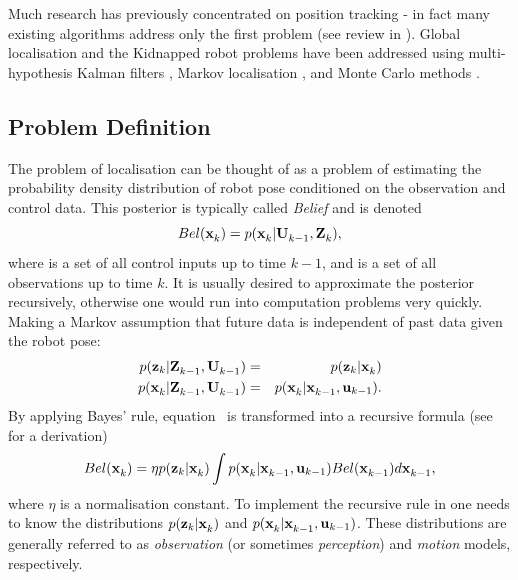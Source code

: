 Much research has previously concentrated on position tracking - in
fact many existing algorithms address only the first problem (see
review in \cite{Borenstein96}). Global localisation and the Kidnapped
robot problems have been addressed using multi-hypothesis Kalman
filters \cite{JensfeltKristensen01,Cox94}, Markov localisation
\cite{Fox99}, and Monte Carlo methods \cite{Thrun00j}.


\subsection{Problem Definition}

The problem of localisation can be thought of as a problem of
estimating the probability density distribution of robot pose
conditioned on the observation and control data.  This posterior is
typically called {\it Belief} and is denoted
\begin{equation}
  Bel(\x{k}{}{}) = p(\x{k}{}{} | \Uall{k-1}{}, \Zall{k}{}),
\label{eqn:localise_belief}
\end{equation}
where  is a set of all control inputs up to time $k-1$, and
 is a set of all observations up to time $k$. It is usually
desired to approximate the posterior recursively, otherwise one would
run into computation problems very quickly. Making a Markov
assumption that future data is independent of past data given the
robot pose:
\begin{eqnarray}
 p(\z{k} | \Zall{k-1}{}, \Uall{k-1}{})    &=& p(\z{k} | \x{k}{}{}) \\
 p(\x{k}{}{} | \Zall{k-1}{}, \Uall{k-1}{})&=& p(\x{k}{}{} | \x{k-1}{}{}, \U{k-1}{}).
\end{eqnarray}
By applying Bayes' rule, equation~ is
transformed into a recursive formula (see \cite{Thrun00j} for a
derivation)
\begin{equation}
Bel(\x{k}{}{}) = \eta p(\z{k} | \x{k}{}{}) \int 
                     p(\x{k}{}{} | \x{k-1}{}{}, \U{k-1}{}) 
                     Bel(\x{k-1}{}{}) d \x{k-1}{}{},
\label{eqn:localise_recursion}
\end{equation}
where $\eta$ is a normalisation constant. To implement the recursive
rule in  one needs to know the
distributions $p(\z{k} | \x{k}{}{})$ and $p(\x{k}{}{} | \x{k-1}{}{},
\U{k-1}{})$. These distributions are generally referred to as {\it
observation} (or sometimes {\it perception}) and {\it motion} models,
respectively. 

